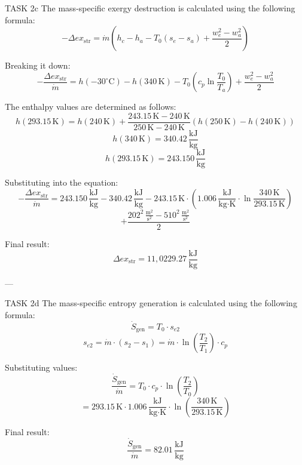 TASK 2c  
The mass-specific exergy destruction is calculated using the following formula:  
\[
-\Delta ex_{\text{str}} = \dot{m} \left( h_c - h_a - T_0 (s_e - s_a) + \frac{w_e^2 - w_a^2}{2} \right)
\]  

Breaking it down:  
\[
-\frac{\Delta ex_{\text{str}}}{\dot{m}} = h(-30^\circ\text{C}) - h(340 \, \text{K}) - T_0 \left( c_p \ln \frac{T_0}{T_a} \right) + \frac{w_e^2 - w_a^2}{2}
\]  

The enthalpy values are determined as follows:  
\[
h(293.15 \, \text{K}) = h(240 \, \text{K}) + \frac{243.15 \, \text{K} - 240 \, \text{K}}{250 \, \text{K} - 240 \, \text{K}} \left( h(250 \, \text{K}) - h(240 \, \text{K}) \right)
\]  
\[
h(340 \, \text{K}) = 340.42 \, \frac{\text{kJ}}{\text{kg}}
\]  
\[
h(293.15 \, \text{K}) = 243.150 \, \frac{\text{kJ}}{\text{kg}}
\]  

Substituting into the equation:  
\[
-\frac{\Delta ex_{\text{str}}}{\dot{m}} = 243.150 \, \frac{\text{kJ}}{\text{kg}} - 340.42 \, \frac{\text{kJ}}{\text{kg}} - 243.15 \, \text{K} \cdot (1.006 \, \frac{\text{kJ}}{\text{kg·K}} \cdot \ln \frac{340 \, \text{K}}{293.15 \, \text{K}})
\]  
\[
+ \frac{202^2 \, \frac{\text{m}^2}{\text{s}^2} - 510^2 \, \frac{\text{m}^2}{\text{s}^2}}{2}
\]  

Final result:  
\[
\Delta ex_{\text{str}} = 11,0229.27 \, \frac{\text{kJ}}{\text{kg}}
\]  

---

TASK 2d  
The mass-specific entropy generation is calculated using the following formula:  
\[
\dot{S}_{\text{gen}} = T_0 \cdot s_{e2}
\]  
\[
s_{e2} = \dot{m} \cdot (s_2 - s_1) = \dot{m} \cdot \ln \left( \frac{T_2}{T_1} \right) \cdot c_p
\]  

Substituting values:  
\[
\frac{\dot{S}_{\text{gen}}}{\dot{m}} = T_0 \cdot c_p \cdot \ln \left( \frac{T_2}{T_0} \right)
\]  
\[
= 293.15 \, \text{K} \cdot 1.006 \, \frac{\text{kJ}}{\text{kg·K}} \cdot \ln \left( \frac{340 \, \text{K}}{293.15 \, \text{K}} \right)
\]  

Final result:  
\[
\frac{\dot{S}_{\text{gen}}}{\dot{m}} = 82.01 \, \frac{\text{kJ}}{\text{kg}}
\]